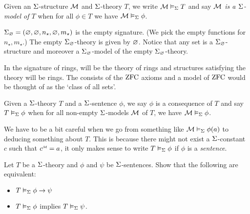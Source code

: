 \begin{dfn}[Models] 
    Given an $\Sigma$-structure $\mathcal{M}$ and $\Sigma$-theory $T$, 
    we write $\mathcal{M} \vDash_{\Sigma} T$ and say
    \emph{$\mathcal{M}$ is a $\Sigma$-model of $T$} when 
    for all $\phi \in T$ we have $\mathcal{M} \vDash_{\Sigma} \phi$.
\end{dfn}

\begin{eg}
    $\Sigma_\varnothing = (\varnothing, \varnothing, n_\star, \varnothing, m_\star)$ 
    is the empty signature.
    (We pick the empty functions for $n_\star, m_\star$.)
    The empty $\Sigma_\varnothing$-theory is given by $\varnothing$.
    Notice that any set is a $\Sigma_\varnothing$-structure and moreover
    a $\Sigma_\varnothing$-model of the empty $\Sigma_\varnothing$-theory.
\end{eg}

\begin{eg}
    In the signature of rings, 
     will be the theory
    of rings and structures satisfying the theory will be rings.
    The  %
    consists of the $\operatorname{ZFC}$ axioms and a model of $\operatorname{ZFC}$ would be thought of as 
    the `class of all sets'.
\end{eg}

\begin{dfn}[Consequence]
    Given a $\Sigma$-theory $T$ 
    and a $\Sigma$-sentence $\phi$,
    we say $\phi$ is a consequence of $T$
    and say $T \vDash_{\Sigma} \phi$ 
    when for all non-empty $\Sigma$-models $\mathcal{M}$ of $T$, 
    we have $\mathcal{M} \vDash_{\Sigma} \phi$.
\end{dfn}
\begin{rmk}
    We have to be a bit careful when we go from something like
    $\mathcal{M} \vDash_{\Sigma} \phi(a)$ to deducing something about $T$.
    This is because there might not exist a $\Sigma$-constant $c$ 
    such that $\modintp{\MM}{c} = a$,
    it only makes sense to write $T \vDash_{\Sigma} \phi$ if $\phi$
    is a \emph{sentence}.
\end{rmk}

\begin{ex}
    Let $T$ be a $\Sigma$-theory and $\phi$ and $\psi$ be $\Sigma$-sentences.
    Show that the following are equivalent:
    \begin{itemize}
        \item $T \vDash_{\Sigma} \phi \to \psi$
        \item $T \vDash_{\Sigma} \phi$ implies $T \vDash_{\Sigma} \psi$.
    \end{itemize}
\end{ex}

